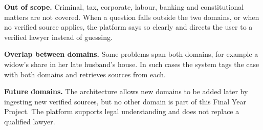 \documentclass[11pt,a4paper]{article}
\begin{document}
\textbf{Out of scope.} Criminal, tax, corporate, labour, banking and constitutional matters are not covered. When a question falls outside the two domains, or when no verified source applies, the platform says so clearly and directs the user to a verified lawyer instead of guessing.

\textbf{Overlap between domains.} Some problems span both domains, for example a widow's share in her late husband's house. In such cases the system tags the case with both domains and retrieves sources from each.

\textbf{Future domains.} The architecture allows new domains to be added later by ingesting new verified sources, but no other domain is part of this Final Year Project. The platform supports legal understanding and does not replace a qualified lawyer.
\end{document}
